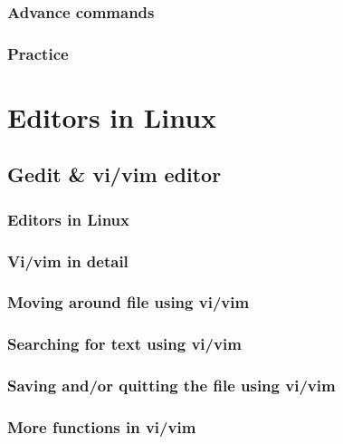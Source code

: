 \documentclass[14pt,fleqn]{extbook} %
\begin{document}
\subsection{Advance commands}

\subsection{Practice}


\chapter{Editors in Linux}
\section{Gedit \& vi/vim editor}

\subsection{Editors in Linux}

\subsection{Vi/vim in detail}

\subsection{Moving around file using vi/vim}

\subsection{Searching for text using vi/vim}

\subsection{Saving and/or quitting the file using vi/vim}

\subsection{More functions in vi/vim}

\end{document}

